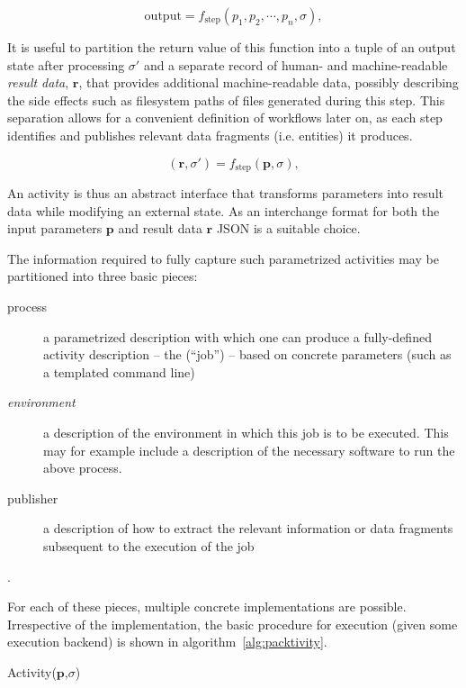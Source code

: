 \documentclass[a4paper]{jpconf}
\begin{document}
\begin{equation}
\mathrm{output} = f_{\mathrm{step}}(p_1,p_2,\cdots,p_n, \sigma),
\label{eq:singlestep}
\end{equation}

It is useful to partition the return value of this function into a tuple of an output state after processing $\sigma'$ and a separate record of human- and machine-readable \emph{result data}, $\mathbf{r}$, that provides additional machine-readable data, possibly describing the side effects such as filesystem paths of files generated during this step. This separation allows for a convenient definition of workflows later on, as each step identifies and publishes relevant data fragments (i.e. entities) it produces.

\begin{equation}
(\mathbf{r},\sigma') = f_{\mathrm{step}}(\mathbf{p}, \sigma),
\label{eq:singlestep_v2}
\end{equation}

An activity is thus an abstract interface that transforms parameters into result data while modifying an external state. As an interchange format for both the input parameters $\mathbf{p}$ and result data $\mathbf{r}$ JSON is a suitable choice.

The information required to fully capture such parametrized activities may be partitioned into three basic pieces:

\begin{description}
    \item[process] a parametrized description with which one can produce a fully-defined activity description -- the (``job'') -- based on concrete parameters (such as a templated command line)
    \item[\emph{environment}] a description of the environment in which this job is to be executed. This may for example include a description of the necessary software to run the above process.
    \item[publisher] a description of how to extract the relevant information or data fragments subsequent to the execution of the job
\end{description}.

For each of these pieces, multiple concrete implementations are possible. Irrespective of the implementation, the basic procedure for execution (given some execution backend) is shown in algorithm~\ref{alg:packtivity}.

\begin{algorithm}[H]
\footnotesize
 \caption{Activity($\mathbf{p}$,$\sigma$)}
 \label{alg:packtivity}
\end{algorithm}
\end{document}
